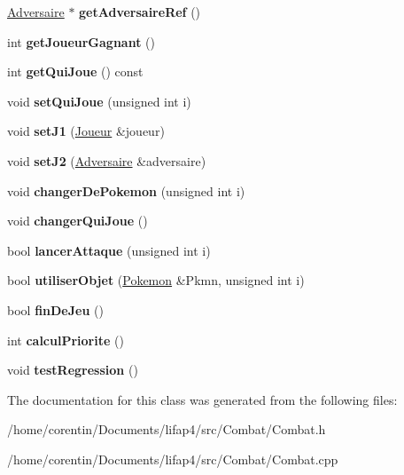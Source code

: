 \begin{DoxyCompactItemize}
\hyperlink{class_adversaire}{Adversaire} $\ast$ {\bfseries get\+Adversaire\+Ref} ()
\item 
\mbox{\label{class_combat_ac02efb89c200ba49e86bb74fdc7dba21}} 
int {\bfseries get\+Joueur\+Gagnant} ()
\item 
\mbox{\label{class_combat_aed2119127fb9b7ed023dd481927c27aa}} 
int {\bfseries get\+Qui\+Joue} () const
\item 
\mbox{\label{class_combat_a292caf86cb2c8ecbf9ecd055e6a028c0}} 
void {\bfseries set\+Qui\+Joue} (unsigned int i)
\item 
\mbox{\label{class_combat_a7ff4ea33e3bafa37fd8f5a0754955b4f}} 
void {\bfseries set\+J1} (\hyperlink{class_joueur}{Joueur} \&joueur)
\item 
\mbox{\label{class_combat_a2093b3be4975b62aa546d54f108834f3}} 
void {\bfseries set\+J2} (\hyperlink{class_adversaire}{Adversaire} \&adversaire)
\item 
\mbox{\label{class_combat_a567eab49812ecbd2d694e8cf064e800a}} 
void {\bfseries changer\+De\+Pokemon} (unsigned int i)
\item 
\mbox{\label{class_combat_a2848c91d76a09943dd5effb1904f1937}} 
void {\bfseries changer\+Qui\+Joue} ()
\item 
\mbox{\label{class_combat_a735c71f16ce62c1dbe3a40cdca6ca44b}} 
bool {\bfseries lancer\+Attaque} (unsigned int i)
\item 
\mbox{\label{class_combat_a3ab678df151ed9210806f89d1aeb47ab}} 
bool {\bfseries utiliser\+Objet} (\hyperlink{class_pokemon}{Pokemon} \&Pkmn, unsigned int i)
\item 
\mbox{\label{class_combat_abbaadce2f31d9b12645481cc74a021b2}} 
bool {\bfseries fin\+De\+Jeu} ()
\item 
\mbox{\label{class_combat_ad1fb106750152c5008a04efc5b2b432d}} 
int {\bfseries calcul\+Priorite} ()
\item 
\mbox{\label{class_combat_ab8ad53e804e2dccddf100af63d5892e6}} 
void {\bfseries test\+Regression} ()
\end{DoxyCompactItemize}


The documentation for this class was generated from the following files\+:\begin{DoxyCompactItemize}
\item 
/home/corentin/\+Documents/lifap4/src/\+Combat/Combat.\+h\item 
/home/corentin/\+Documents/lifap4/src/\+Combat/Combat.\+cpp\end{DoxyCompactItemize}

